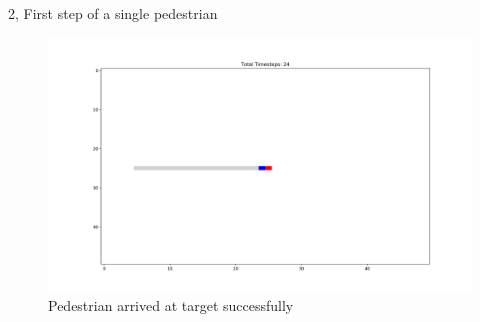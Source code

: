 \documentclass[10pt,a4paper]{article}
\begin{document}
\begin{task}{2, First step of a single pedestrian}
\begin{figure}
    \centering
    \includegraphics[width=\textwidth]{pictures/End.png}
    \caption{Pedestrian arrived at target successfully}
    \label{fig:end_2}
\end{figure}
\end{task}
\end{document}
